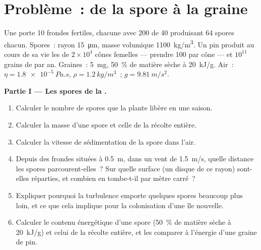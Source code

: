 \section{Problème~: de la spore à la graine}

\begin{problem}
\label{pb:b2:plant-life-cycles:1}
Une  porte \num{10} frondes fertiles, chacune avec \num{200}
 de \num{40}  produisant \num{64} spores chacun. Spores~:
rayon \qty{15}{\micro m}, masse volumique \qty{1100}{kg/m^3}. Un pin
produit au cours de sa vie les  de $2\times 10^{4}$ cônes femelles
--- prendre \num{100}  par cône --- et $10^{11}$ grains de 
par an. Graines~: \qty{5}{mg}, \qty{50}{\%} de matière sèche à
\qty{20}{kJ/g}. Air~: $\eta = \qty{1.8e-5}{Pa.s}$, $\rho =
\qty{1.2}{kg/m^3}$~; $g = \qty{9.81}{m/s^2}$.

\medskip
\noindent\textbf{Partie I --- Les spores de la .}
\begin{enumerate}
  \item Calculer le nombre de spores que la plante libère en une saison.
  \item Calculer la masse d'une spore et celle de la récolte entière.
  \item Calculer la vitesse de sédimentation de la spore dans l'air.
  \item Depuis des frondes situées à \qty{0.5}{m}, dans un vent de
        \qty{1.5}{m/s}, quelle distance les spores parcourent-elles~? Sur
        quelle surface (un disque de ce rayon) sont-elles réparties, et
        combien en tombe-t-il par mètre carré~?
  \item Expliquer pourquoi la turbulence emporte quelques spores beaucoup
        plus loin, et ce que cela implique pour la colonisation d'une île
        nouvelle.
  \item Calculer le contenu énergétique d'une spore (\qty{50}{\%} de
        matière sèche à \qty{20}{kJ/g}) et celui de la récolte entière,
        et les comparer à l'énergie d'une graine de pin.
\end{enumerate}


\end{problem}
